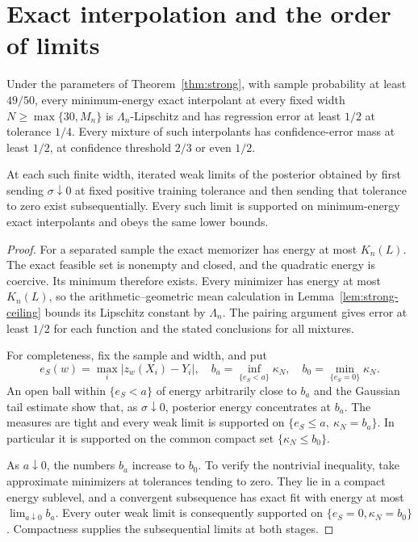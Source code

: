 \documentclass[11pt]{article}
\theoremstyle{remark}\newtheorem{remark}[theorem]{Remark}
\begin{document}
\section{Exact interpolation and the order of limits}\label{sec:exact}
\begin{corollary}
\label{cor:exact}
Under the parameters of Theorem~\ref{thm:strong}, with sample
probability at least $49/50$, every minimum-energy exact interpolant
at every fixed width $N\ge\max\{30,M_n\}$ is $\Lambda_n$-Lipschitz
and has regression error at least $1/2$ at tolerance $1/4$.
Every mixture of such interpolants has confidence-error mass at least
$1/2$, at confidence threshold $2/3$ or even $1/2$.

At each such finite width, iterated weak limits of the posterior
obtained by first sending $\sigma\downarrow0$ at fixed positive
training tolerance and then sending that tolerance to zero exist
subsequentially. Every such limit is supported on minimum-energy exact
interpolants and obeys the same lower bounds.
\end{corollary}
\begin{proof}
For a separated sample the exact memorizer has energy at most $K_n(L)$.
The exact feasible set is nonempty and closed, and the quadratic energy
is coercive. Its minimum therefore exists. Every minimizer has energy
at most $K_n(L)$, so the arithmetic--geometric mean calculation in
Lemma~\ref{lem:strong-ceiling} bounds its Lipschitz constant by
$\Lambda_n$. The pairing argument gives error at least $1/2$ for
each function and the stated conclusions for all mixtures.

For completeness, fix the sample and width, and put
\[
 e_S(w)=\max_i|z_w(X_i)-Y_i|,\quad
 b_a=\inf_{\{e_S<a\}}\kappa_N,\quad
 b_0=\min_{\{e_S=0\}}\kappa_N.
\]
An open ball within $\{e_S<a\}$ of energy arbitrarily close to
$b_a$ and the Gaussian tail estimate show that, as $\sigma\downarrow0$,
posterior energy concentrates at $b_a$. The measures are tight and
every weak limit is supported on
$\{e_S\le a,\ \kappa_N=b_a\}$. In particular it is supported on
the common compact set $\{\kappa_N\le b_0\}$.

As $a\downarrow0$, the numbers $b_a$ increase to $b_0$. To verify
the nontrivial inequality, take approximate minimizers at tolerances
tending to zero. They lie in a compact energy sublevel, and a
convergent subsequence has exact fit with energy at most
$\lim_{a\downarrow0}b_a$. Every outer weak limit is consequently
supported on $\{e_S=0,\kappa_N=b_0\}$. Compactness supplies the
subsequential limits at both stages.
\end{proof}
\end{document}
